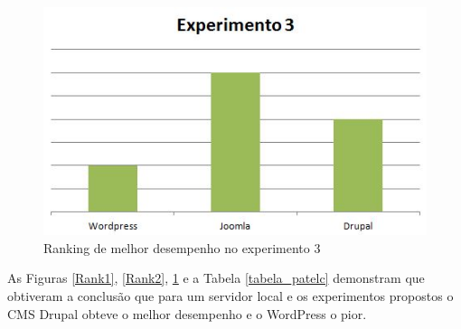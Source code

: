 \begin{figure}[!htb]
\centering
\includegraphics[keepaspectratio=true,scale=0.65]{figuras/exp003.JPG}
\caption{Ranking de melhor desempenho no experimento 3}
\label{Rank3}
\end{figure} 

\clearpage

As Figuras \ref{Rank1}, \ref{Rank2}, \ref{Rank3} e a Tabela \ref{tabela_patelc} demonstram que  obtiveram a conclusão que para um servidor local e os experimentos propostos o CMS Drupal obteve o melhor desempenho e o WordPress o pior.





